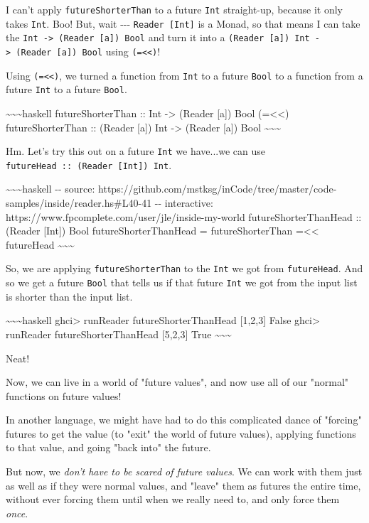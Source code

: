 \documentclass[]{article}
\begin{document}
I can't apply \texttt{futureShorterThan} to a future \texttt{Int} straight-up,
because it only takes \texttt{Int}. Boo! But, wait -\/-\/-
\texttt{Reader\ {[}Int{]}} is a Monad, so that means I can take the
\texttt{Int\ -\textgreater{}\ (Reader\ {[}a{]})\ Bool} and turn it into a
\texttt{(Reader\ {[}a{]})\ Int\ -\textgreater{}\ (Reader\ {[}a{]})\ Bool} using
\texttt{(=\textless{}\textless{})}!

Using \texttt{(=\textless{}\textless{})}, we turned a function from \texttt{Int}
to a future \texttt{Bool} to a function from a future \texttt{Int} to a future
\texttt{Bool}.

\textasciitilde{}\textasciitilde{}\textasciitilde{}haskell futureShorterThan ::
Int -\textgreater{} (Reader {[}a{]}) Bool (=\textless{}\textless{})
futureShorterThan :: (Reader {[}a{]}) Int -\textgreater{} (Reader {[}a{]}) Bool
\textasciitilde{}\textasciitilde{}\textasciitilde{}

Hm. Let's try this out on a future \texttt{Int} we have...we can use
\texttt{futureHead\ ::\ (Reader\ {[}Int{]})\ Int}.

\textasciitilde{}\textasciitilde{}\textasciitilde{}haskell -\/- source:
https://github.com/mstksg/inCode/tree/master/code-samples/inside/reader.hs\#L40-41
-\/- interactive: https://www.fpcomplete.com/user/jle/inside-my-world
futureShorterThanHead :: (Reader {[}Int{]}) Bool futureShorterThanHead =
futureShorterThan =\textless{}\textless{} futureHead
\textasciitilde{}\textasciitilde{}\textasciitilde{}

So, we are applying \texttt{futureShorterThan} to the \texttt{Int} we got from
\texttt{futureHead}. And so we get a future \texttt{Bool} that tells us if that
future \texttt{Int} we got from the input list is shorter than the input list.

\textasciitilde{}\textasciitilde{}\textasciitilde{}haskell ghci\textgreater{}
runReader futureShorterThanHead {[}1,2,3{]} False ghci\textgreater{} runReader
futureShorterThanHead {[}5,2,3{]} True
\textasciitilde{}\textasciitilde{}\textasciitilde{}

Neat!

Now, we can live in a world of "future values", and now use all of our "normal"
functions on future values!

In another language, we might have had to do this complicated dance of "forcing"
futures to get the value (to "exit" the world of future values), applying
functions to that value, and going "back into" the future.

But now, we \emph{don't have to be scared of future values}. We can work with
them just as well as if they were normal values, and "leave" them as futures the
entire time, without ever forcing them until when we really need to, and only
force them \emph{once}.
\end{document}
